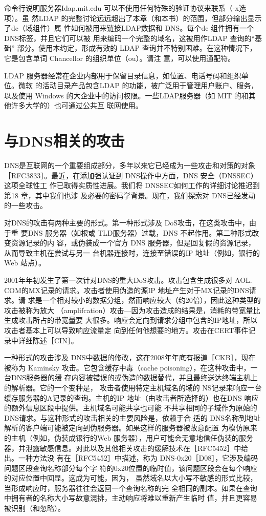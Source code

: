 命令行说明服务器Idap.mit.edu 可以不使用任何特殊的验证协议来联系（-x选项）。虽
然LDAP 的完整讨论远远超出了本章（和本书）的范围，但部分输出显示了dc（域组件）属
性如何被用来链接LDAP数据和 DNS。每个dc 组件拥有一个 DNS标签，并且它们可以被
用来编码一个完整的域名，这被用作LDAP 查询的“基础” 部分。使用本约定，形成有效的
LDAP 查询并不特别困难。在这种情况下，它是包含单词 Chancellor 的组织单位（ou）。请注
意，可以使用通配符。

LDAP 服务器经常在企业内部用于保留目录信息，如位置、电话号码和组织单位。微软
的活动目录产品包含LDAP 的功能，被广泛用于管理用户账户、服务，以及使用 Windows
的大企业中的访问权限。一些LDAP服务器（如 MIT 的和其他许多大学的）也可通过公共互
联网使用。

\section{与DNS相关的攻击}

DNS是互联网的一个重要组成部分，多年以来它已经成为一些攻击和对策的对象
［RFC3833］。最近，在添加强认证到 DNS操作中方面，DNS 安全（DNSSEC）这项全球性工
作已取得实质性进展。我们将 DNSSEC如何工作的详细讨论推迟到第18 章，其中我们也涉
及必要的密码学背景。现在，我们探索对 DNS已经发动的一些攻击。

对DNS的攻击有两种主要的形式。第一种形式涉及 DoS攻击，在这类攻击中，由于重
要DNS 服务器（如根或 TLD服务器）过载，DNS 不起作用。第二种形式改变资源记录的内
容，或伪装成一个官方 DNS 服务器，但是回复假的资源记录，从而导致主机在尝试与另一
台机器连接时，连接至错误的IP 地址（例如，银行的Web 站点）。

2001年年初发生了第一次针对DNS的重大DoS攻击。攻击包含生成很多对 AOL.
COM的MX记录的请求。攻击者使用伪造的源IP 地址产生对于MX记录的DNS请求。请
求是一个相对较小的数据分组，然而响应较大（约20倍），因此这种类型的攻击被称为放大
（amplifcation）攻击—因为攻击造成的结果是，消耗的带宽量比生成攻击所占的带宽量要
大很多。响应会定向到请求分组中包含的IP地址，所以攻击者基本上可以导致响应流量定
向到任何他想要的地方。攻击在CERT事件记录中详细陈述［CIN］。

一种形式的攻击涉及 DNS中数据的修改，这在2008年年底有报道［CKB］，现在被称为
Kaminsky 攻击。它包含缓存中毒（cache poisoning），在这种攻击中，一台DNS服务器的缓
存内容被错误的或伪造的数据替代，并且最终送达终端主机上的解析器。它的一个变种是，
攻击者使用特定主机域名的域的 NS记录来响应一台缓存服务器的A记录的查询。主机的IP
地址（由攻击者所选择的）也在DNS 响应的额外信息区段中提供。主机域名可能共享也可能
不共享相同的子域作为原始的 DNS请求。与这种形式的攻击相关的主要风险是，依赖于合
适的 DNS名称到地址解析的客户端可能被定向到伪服务器。如果这样的服务器被故意配置
为模仿原来的主机（例如，伪装成银行的Web 服务器），用户可能会无意地信任伪装的服务
器，并泄露敏感信息。对此以及其他相关攻击的缓解技术在［RFC5452］中给出。一种方法没
有在［RFC5452］中描述，称为 DNS-0x20［D08］，它涉及编码问题区段查询名称部分每个字
符的0x20位置的临时值，该问题区段会在每个响应的对应位置中回显。这成为可能，因为，
虽然域名以大小写不敏感的形式比较，当形成响应时，服务器往往会返回一个查询名称的完
全相同的副本。如果在查询中拥有者的名称大小写故意混排，主动响应将难以重新产生临时
值，并且更容易被识别（和忽略）。

